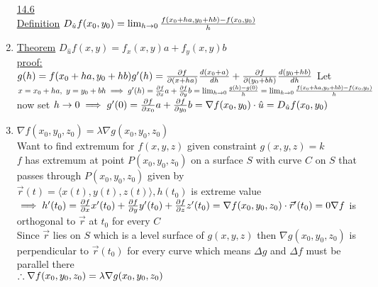 \documentclass[12pt]{amsart}
\begin{document}
\begin{enumerate}
\underline{14.6}\\
\underline{Definition} $D_{\hat{u}} f(x_0,y_0) = \lim_{h \rightarrow 0} \frac{ f(x_0 + h a, y_0 + hb) - f(x_0,y_0)}{h}\\$

\item \underline{Theorem} $D_{\hat{u}} f(x,y) = f_x(x,y) a + f_y (x,y) b$\\
\underline{proof:}\\
$g(h) = f(x_0 + ha, y_0 + hb)\\
g'(h) = \frac{\partial f}{\partial (x + h a)} \frac{ d(x_0 + a)}{dh} + \frac{\partial f}{\partial (y_0 + bh)} \frac{d(y_0 + hb)}{dh}\\$
Let $x = x_0 + ha,\,\, y = y_0 + bh\\
\implies g'(h) = \frac{\partial f}{\partial x} a + \frac{\partial f}{\partial y} b = \lim_{h \rightarrow 0} \frac{g(h) - g(0)}{h}\\
= \lim_{h \rightarrow 0} \frac{f(x_0 + ha, y_0 + hb) - f(x_0,y_0)}{h}\\$
now set $h \rightarrow 0\\
\implies g'(0) = \frac{\partial f}{\partial x_0} a + \frac{\partial f}{\partial y_0} b = \nabla f(x_0, y_0) \cdot \hat{u} = D_{\hat{u}} f(x_0, y_0)$


\hdashrule[0.5ex][c]{\linewidth}{0.5pt}{1.5mm}


\item \underline{$\nabla f(x_0, y_0, z_0) = \lambda \nabla g(x_0, y_0, z_0)$}\\
Want to find extremum for $f(x,y,z)$ given constraint $g(x,y,z) = k$\\
$f$ has extremum at point $P(x_0,y_0,z_0)$ on a surface $S$ with curve $C$ on $S$ that passes through $P(x_0,y_0,z_0)$ given by\\
$\vec{r}(t) = \langle x(t), y(t), z(t) \rangle, h(t_0)$ is extreme value\\
$\implies h'(t_0) = \frac{\partial f}{\partial x} x'(t_0) + \frac{\partial f}{\partial y} y'(t_0) + \frac{\partial f}{\partial z} z'(t_0)\\
= \nabla f(x_0,y_0,z_0) \cdot \vec{r}'(t_0) = 0\\
\nabla f$ is orthogonal to $\vec{r}$ at $t_0$ for every $C$\\
Since $\vec{r}$ lies on $S$ which is a level surface of $g(x,y,z)$ then $\nabla g (x_0,y_0,z_0)$ is perpendicular to $\vec{r}(t_0)$ for every curve which means $\Delta g$ and $\Delta f$ must be parallel there\\
$\therefore \nabla f(x_0,y_0, z_0) = \lambda \nabla g(x_0,y_0,z_0)\\$



\end{enumerate}
\end{document}
